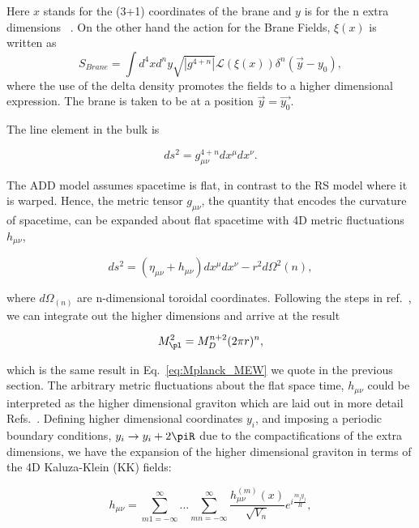 Here $x$ stands for the (3+1) coordinates of the brane and $y$ is for the n extra dimensions ~\cite{Perez-Lorenzana:2005fzz}. On the other hand the action for the Brane Fields, $\xi(x)$ is written as
\begin{equation}
    \label{eq:SBraneADD}
     S_{Brane} = \int d^{4}xd^ny \sqrt{|g^{4+n}|} \mathcal{L}(\xi(x)) \delta^{n}(\Vec{y}-y_0), 
\end{equation}
where the use of the delta density promotes the fields to a higher dimensional expression. The brane is taken to be at a position $\Vec{y}=\Vec{y_0}$.

The line element in the bulk is 

\begin{equation}
    \label{eq:ADDBulkMetric}
    ds^2 = g^{4+n}_{\mu\nu}dx^{\mu}dx^{\nu}.
\end{equation}

The ADD model assumes spacetime is flat, in contrast to the RS model where it is warped. Hence, the metric tensor $g_{\mu\nu}$, the quantity that encodes the curvature of spacetime, can be expanded about flat spacetime with 4D metric fluctuations $h_{\mu\nu}$,

\begin{equation}
    \label{eq:ADDBulkMetric}
    ds^2 = (\eta_{\mu\nu} + h_{\mu\nu})dx^{\mu}dx^{\nu}-r^2d\Omega^2(n), 
\end{equation}

where $d\Omega_{(n)}$ are n-dimensional toroidal coordinates. Following the steps in ref.~\cite{Kribs:2006mq}, we can integrate out the higher dimensions and arrive at the result

\begin{equation}
    \label{eq:MplanckVolume}
    M^2_{\pl} = M^{n+2}_D (2 \pi r)^n,
\end{equation}

which is the same result in Eq.~\ref{eq:Mplanck_MEW} we quote in the previous section. The arbitrary metric fluctuations about the flat space time, $h_{\mu\nu}$ could be interpreted as the higher dimensional graviton which are laid out in more detail Refs.~\cite{Perez-Lorenzana:2005fzz,Kribs:2006mq, Giudice:1998ck}. Defining higher dimensional coordinates $y_i$, and imposing a periodic boundary conditions, $y_i \rightarrow y_i + 2\piR$ due to the compactifications of the extra dimensions, we have the expansion of the higher dimensional graviton in terms of the 4D Kaluza-Klein (KK) fields:

\begin{equation}
    \label{eq:KKexpansion}
    h_{\mu\nu} = \sum_{m1 = -\infty}^{\infty} ... \sum_{mn = -\infty}^{\infty} \frac{h^{(m)}_{\mu\nu}(x)}{\sqrt{V_n}} e^{i\frac{m_jy_j}{R}},
\end{equation} 

